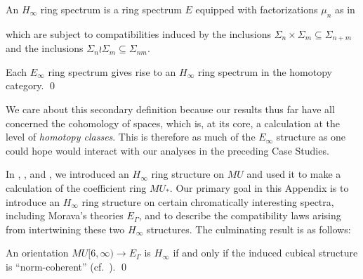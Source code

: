 \begin{definition}
An $H_\infty$ ring spectrum is a ring spectrum $E$ equipped with factorizations $\mu_n$ as in
\begin{center}
\end{center}
which are subject to compatibilities induced by the inclusions $\Sigma_n \times \Sigma_m \subseteq \Sigma_{n+m}$ and the inclusions $\Sigma_n \wr \Sigma_m \subseteq \Sigma_{nm}$.
\end{definition}

\begin{lemma}
Each $E_\infty$ ring spectrum gives rise to an $H_\infty$ ring spectrum in the homotopy category. \qed
\end{lemma}

\noindent We care about this secondary definition because our results thus far have all concerned the cohomology of spaces, which is, at its core, a calculation at the level of \emph{homotopy classes}.  This is therefore as much of the $E_\infty$ structure as one could hope would interact with our analyses in the preceding Case Studies.

In , , and , we introduced an $H_\infty$ ring structure on $MU$ and used it to make a calculation of the coefficient ring $MU_*$.  Our primary goal in this Appendix is to introduce an $H_\infty$ ring structure on certain chromatically interesting spectra, including Morava's theories $E_\Gamma$, and to describe the compatibility laws arising from intertwining these two $H_\infty$ structures.  The culminating result is as follows:

\begin{theorem}
An orientation $MU[6, \infty) \to E_\Gamma$ is $H_\infty$ if and only if the induced cubical structure is ``norm-coherent'' (cf.\ ). \qed
\end{theorem}


